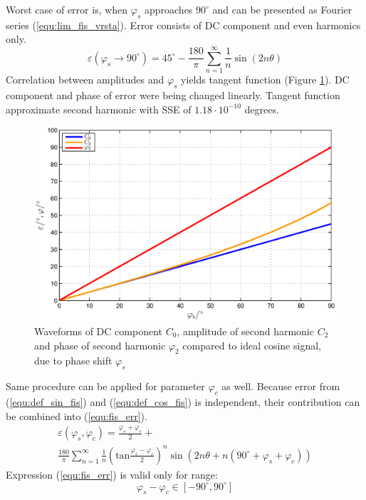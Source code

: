 \documentclass[a4paper]{article}
\begin{document}
Worst case of error is, when $\varphi_s$ approaches $90^\circ$ and can be presented as Fourier series (\ref{equ:lim_fis_vrsta}). Error consists of DC component and even harmonics only.
\begin{equation}
\label{equ:lim_fis_vrsta}
\varepsilon(\varphi_{s} \rightarrow 90^\circ) = 45^\circ - \frac{180}{\pi}\sum_{n=1}^{\infty}\frac{1}{n} \sin (2n \theta)
\end{equation}
Correlation between amplitudes and $\varphi_{s}$ yields tangent function (Figure \ref{fig:fis}). DC component and phase of error were being changed linearly. Tangent function approximate second harmonic with SSE of $1.18 \cdot 10^{-10}$ degrees.
\begin{figure}[!htb]
	\begin{center}
		\includegraphics[width=\linewidth]{./Slike/fis.eps}
		\caption{Waveforms of DC component $C_0$, amplitude of second harmonic  $C_2$ and phase of second harmonic $\varphi_2$ compared to ideal cosine signal, due to phase shift $\varphi_{s}$} \label{fig:fis}
	\end{center}
\end{figure}

Same procedure can be applied for parameter $\varphi_c$ as well.
Because error from (\ref{equ:def_sin_fis}) and (\ref{equ:def_cos_fis}) is independent, their contribution can be combined into (\ref{equ:fis_err}).
\begin{multline}
\label{equ:fis_err}
\varepsilon(\varphi_{s},\varphi_{c}) = \frac{\varphi_{s}+\varphi_{c}}{2}+\\ \frac{180}{\pi}\sum_{n=1}^{\infty}\frac{1}{n} (\mathrm{tan}\frac{\varphi_{s}-\varphi_{c}}{2})^n \sin (2n \theta+n(90^\circ +\varphi_{s}+\varphi_{c}))
\end{multline}
Expression (\ref{equ:fis_err}) is valid only for range:
$$ \varphi_{s}-\varphi_{c} \in [ -90^\circ , 90^\circ ] $$
\end{document}
